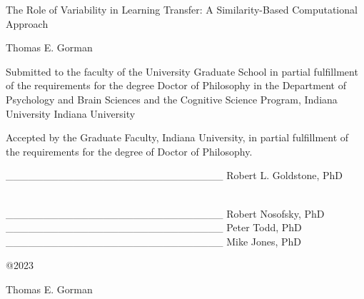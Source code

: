 \documentclass[
  letterpaper,
  DIV=11,
  numbers=noendperiod]{scrartcl}
\author{}
\date{}
\begin{document}
\begin{centering}
\LARGE
{The Role of Variability in Learning Transfer: A Similarity-Based Computational Approach}

 
\vspace*{1.5cm}

\LARGE
{Thomas E. Gorman}

\vspace{16.5cm}

\end{centering}

Submitted to the faculty of the University Graduate School in partial
fulfillment of the requirements for the degree Doctor of Philosophy in
the Department of Psychology and Brain Sciences and the Cognitive
Science Program, Indiana University Indiana University

\vspace{6cm}


\newpage

Accepted by the Graduate Faculty, Indiana University, in partial
fulfillment of the requirements for the degree of Doctor of Philosophy.
\vspace{4cm}

\hfill\break
\_\_\_\_\_\_\_\_\_\_\_\_\_\_\_\_\_\_\_\_\_\_\_\_\_\_\_\_\_ Robert L.
Goldstone, PhD \vspace{2.5cm}\\
\strut \\
\_\_\_\_\_\_\_\_\_\_\_\_\_\_\_\_\_\_\_\_\_\_\_\_\_\_\_\_\_ Robert
Nosofsky, PhD \vspace{2.5cm}\\
\_\_\_\_\_\_\_\_\_\_\_\_\_\_\_\_\_\_\_\_\_\_\_\_\_\_\_\_\_ Peter Todd,
PhD \vspace{2.5cm}\\
\_\_\_\_\_\_\_\_\_\_\_\_\_\_\_\_\_\_\_\_\_\_\_\_\_\_\_\_\_ Mike Jones,
PhD

\newpage

\begin{centering}

\vspace*{6.5cm}

@2023 \\
\vspace{1cm} 

Thomas E. Gorman
\vspace{.2cm}

\vspace{5cm}

\end{centering}
\end{document}
